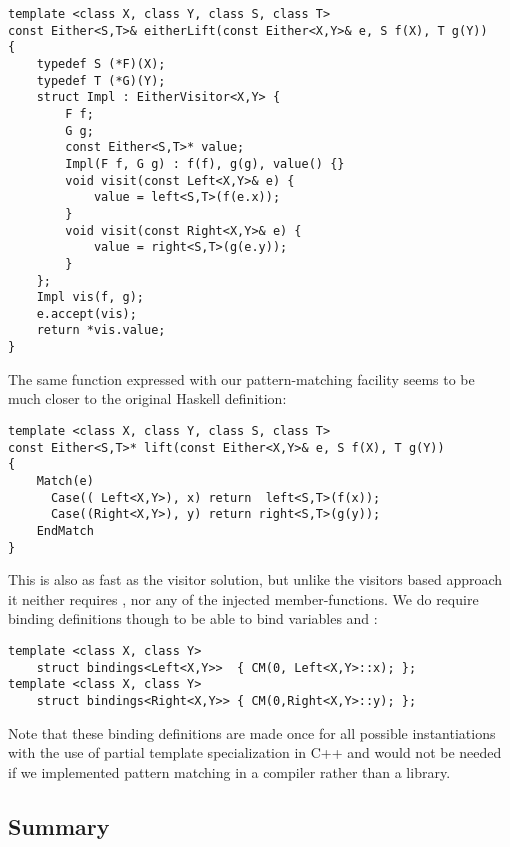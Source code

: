 \begin{lstlisting}
template <class X, class Y, class S, class T>
const Either<S,T>& eitherLift(const Either<X,Y>& e, S f(X), T g(Y))
{
    typedef S (*F)(X);
    typedef T (*G)(Y);
    struct Impl : EitherVisitor<X,Y> {
        F f;
        G g;
        const Either<S,T>* value;
        Impl(F f, G g) : f(f), g(g), value() {}
        void visit(const Left<X,Y>& e) {
            value = left<S,T>(f(e.x));
        }
        void visit(const Right<X,Y>& e) {
            value = right<S,T>(g(e.y));
        }
    };
    Impl vis(f, g);
    e.accept(vis);
    return *vis.value;
}
\end{lstlisting}

\noindent
The same function expressed with our pattern-matching facility seems to be much 
closer to the original Haskell definition:

\begin{lstlisting}[keepspaces,columns=flexible]
template <class X, class Y, class S, class T>
const Either<S,T>* lift(const Either<X,Y>& e, S f(X), T g(Y))
{
    Match(e)
      Case(( Left<X,Y>), x) return  left<S,T>(f(x));
      Case((Right<X,Y>), y) return right<S,T>(g(y));
    EndMatch
}
\end{lstlisting}

\noindent
This is also as fast as the visitor solution, but unlike the visitors based 
approach it neither requires , nor any of the injected 
 member-functions. We do require binding definitions though to be 
able to bind variables  and :


\begin{lstlisting}[keepspaces,columns=flexible]
template <class X, class Y> 
    struct bindings<Left<X,Y>>  { CM(0, Left<X,Y>::x); };
template <class X, class Y> 
    struct bindings<Right<X,Y>> { CM(0,Right<X,Y>::y); };
\end{lstlisting}

\noindent
Note that these binding definitions are made once for all possible instantiations 
with the use of partial template specialization in C++ and would not be needed 
if we implemented pattern matching in a compiler rather than a library.

\subsection{Summary}

